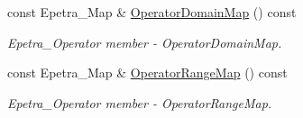 \begin{DoxyCompactItemize}
const Epetra\+\_\+\+Map \& \hyperlink{classoomph_1_1OomphLibPreconditionerEpetraOperator_a2e2aab300fa0c7e9f6d0a395b21ef0e0}{Operator\+Domain\+Map} () const
\begin{DoxyCompactList}\small\item\em Epetra\+\_\+\+Operator member -\/ Operator\+Domain\+Map. \end{DoxyCompactList}\item 
const Epetra\+\_\+\+Map \& \hyperlink{classoomph_1_1OomphLibPreconditionerEpetraOperator_a3aaef66dbb5a054aeccc339ba48bac69}{Operator\+Range\+Map} () const
\begin{DoxyCompactList}\small\item\em Epetra\+\_\+\+Operator member -\/ Operator\+Range\+Map. \end{DoxyCompactList}\end{DoxyCompactItemize}
